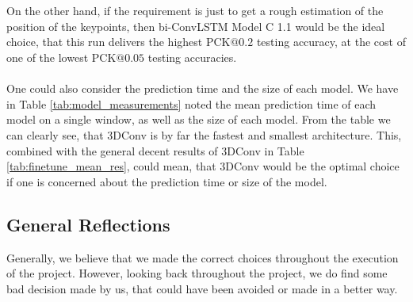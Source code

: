 \documentclass[./main.tex]{subfiles}
\begin{document}
\\
\\
On the other hand, if the requirement is just to get a rough estimation of the position of the keypoints, then bi-ConvLSTM Model C 1.1 would be the ideal choice, that this run delivers the highest PCK$@0.2$ testing accuracy, at the cost of one of the lowest PCK$@0.05$ testing accuracies.
\\
\\
One could also consider the prediction time and the size of each model. We have in Table \ref{tab:model_measurements} noted the mean prediction time of each model on a single window, as well as the size of each model. From the table we can clearly see, that 3DConv is by far the fastest and smallest architecture. This, combined with the general decent results of 3DConv in Table \ref{tab:finetune_mean_res}, could mean, that 3DConv would be the optimal choice if one is concerned about the prediction time or size of the model.


\subsection{General Reflections}
\label{sec:general_reflections}
Generally, we believe that we made the correct choices throughout the execution of the project. However, looking back throughout the project, we do find some bad decision made by us, that could have been avoided or made in a better way.
\end{document}
